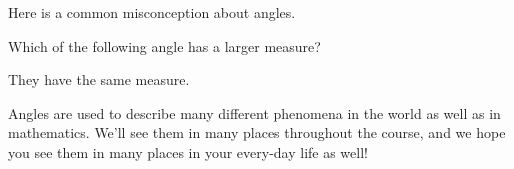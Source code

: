 \documentclass{ximera}
\begin{document}
Here is a common misconception about angles.
\begin{question}
Which of the following angle has a larger measure?
\begin{center}
\end{center}

\begin{multipleChoice}
\choice[correct] They have the same measure.
\end{multipleChoice}
\end{question}

Angles are used to describe many different phenomena in the world as well as in mathematics. We'll see them in many places throughout the course, and we hope you see them in many places in your every-day life as well!
\end{document}
